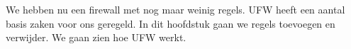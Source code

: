 We hebben nu een firewall met nog maar weinig regels. UFW heeft een aantal basis zaken voor ons geregeld. In dit hoofdstuk gaan we regels toevoegen en verwijder. We gaan zien hoe UFW werkt.

